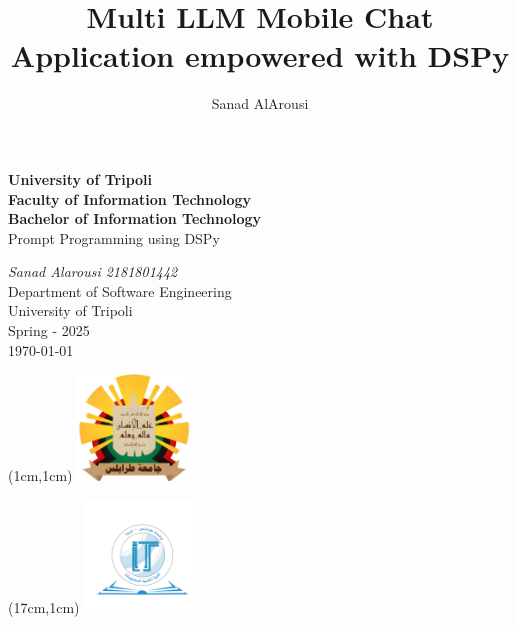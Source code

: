 \documentclass{book}
\title{Multi LLM Mobile Chat Application empowered with DSPy}
\author{Sanad AlArousi}
\begin{document}
\begin{titlepage}
    \begin{center}
        \fontsize{24}{24}\textbf{University of Tripoli}\\[10pt]
        \fontsize{22}{22}\textbf{Faculty of Information Technology}\\[10pt]
        \fontsize{26}{26}\textbf{Bachelor of Information Technology}\\[10pt]
        \vfill
        \Huge{Prompt Programming using DSPy}\\
        \Large{}
        \vfill

        \textit{Sanad Alarousi 2181801442}\\
        Department of Software Engineering\\
        University of Tripoli\\
        Spring - 2025\\
        \today
    \end{center}
    \begin{textblock*}{3cm}(1cm,1cm)
        \includegraphics[width=3cm]{UOT_logo_transp.png}
    \end{textblock*}
    \begin{textblock*}{3cm}(17cm,1cm)
        \includegraphics[width=3cm]{Faculty_logo_transp.png}
    \end{textblock*}
\end{titlepage}

\maketitle
\end{document}
